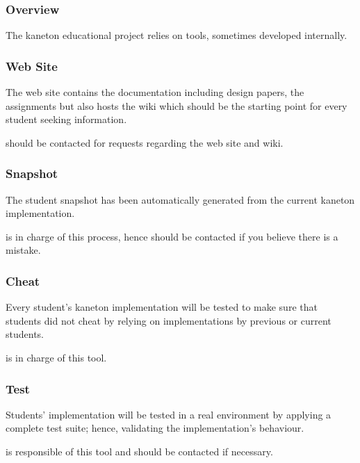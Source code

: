 
\begin{frame}
  \frametitle{Overview}

  The kaneton educational project relies on tools, sometimes developed
  internally.
\end{frame}


\begin{frame}
  \frametitle{Web Site}

  The web site contains the documentation including design papers,
  the assignments \etc{} but also hosts the wiki which should be
  the starting point for every student seeking information.

  \-

   should be contacted for requests regarding the
  web site and wiki.
\end{frame}


\begin{frame}
  \frametitle{Snapshot}

  The student snapshot has been automatically generated from the current
  kaneton implementation.

  \-

   is in charge of this process, hence should be
  contacted if you believe there is a mistake.
\end{frame}


\begin{frame}
  \frametitle{Cheat}

  Every student's kaneton implementation will be tested to make sure that
  students did not cheat by relying on implementations by previous or
  current students.

  \-

   is in charge of this tool.
\end{frame}


\begin{frame}
  \frametitle{Test}

  Students' implementation will be tested in a real environment by applying
  a complete test suite; hence, validating the implementation's behaviour.

  \-

   is responsible of this tool and should be contacted
  if necessary.
\end{frame}

